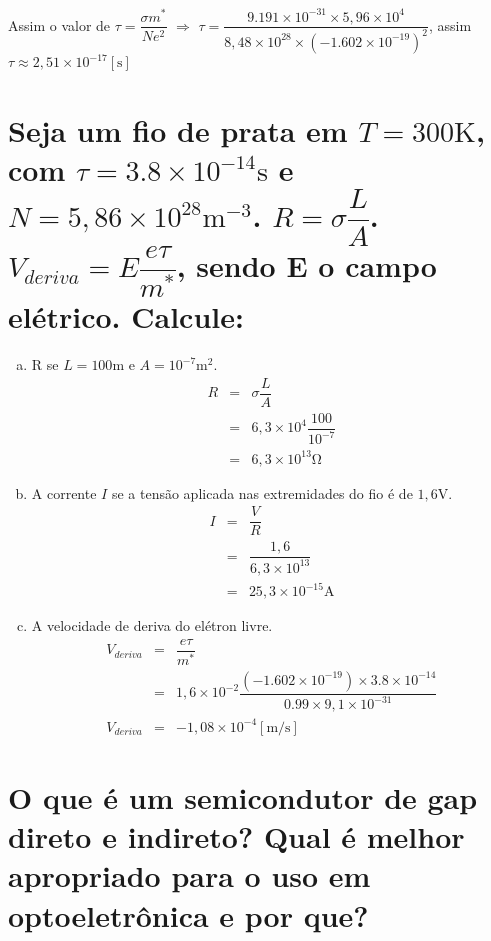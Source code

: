 Assim o valor de $\tau = \dfrac{\sigma m^{*}}{N e^{2}}$ $\Rightarrow$ $\tau = \dfrac{9.191
  \times 10^{-31} \times 5,96 \times 10^{4}}{8,48 \times 10^{28} \times (-1.602 \times 10^{-19})^{2}}$,
assim $\tau \approx 2,51 \times 10^{-17} [\si{\second}]$

\section*{Seja um fio de prata em $T = 300 \si{\kelvin}$, com $\tau = 3.8
  \times 10^{-14} \si{\second}$ e $N = 5,86 \times 10^{28} \si{\meter^{-3}}$. $R
  = \sigma \dfrac{L}{A}$. $V_{deriva} = E \dfrac{e \tau}{m^{*}}$, sendo E o campo
  elétrico. Calcule:}
\label{q12}

\begin{enumerate}[a)]
  \item R se $L = 100 \si{\meter}$ e $A = 10^{-7} \si{\meter^{2}}$.
    \begin{eqnarray*}
      R & = & \sigma \dfrac{L}{A} \\ \nonumber
        & = & 6,3 \times 10^{4} \dfrac{100}{10^{-7}} \\ \nonumber
        & = & 6,3 \times 10^{13} \si{\ohm}\nonumber
    \end{eqnarray*}
  \item A corrente $I$ se a tensão aplicada nas extremidades do fio é
    de $1,6 \si{\volt}$.
    \begin{eqnarray*}
      I & = & \dfrac{V}{R} \\ \nonumber
        & = & \dfrac{1,6}{6,3 \times 10^{13}} \\ \nonumber
        & = & 25,3 \times 10^{-15} \si{\ampere}\nonumber
    \end{eqnarray*}
  \item A velocidade de deriva do elétron livre.
    \begin{eqnarray*}
      V_{deriva} & = &  \dfrac{e \tau}{m^{*}} \\ \nonumber
               & = & 1,6 \times 10^{-2} \dfrac
                       {(-1.602 \times 10^{-19}) \times 3.8 \times 10^{-14}}
                       {0.99 \times 9,1 \times 10^{-31}} \\ \nonumber
      V_{deriva} & = & - 1,08 \times 10^{-4} [\si{\meter/\second}] \nonumber
    \end{eqnarray*}
  \end{enumerate}

\section*{O que  é um semicondutor  de gap  direto e indireto?  Qual é
melhor apropriado para o uso em optoeletrônica e por que?}
\label{q13}

